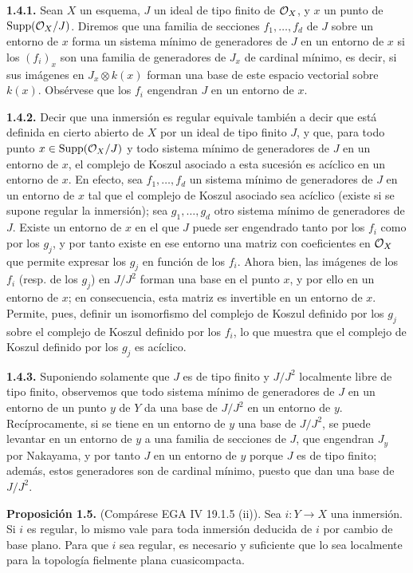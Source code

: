 \textbf{1.4.1.} Sean $X$ un esquema, $J$ un ideal de tipo finito de $\mathcal O_X$, y $x$ un punto de $\operatorname{Supp}(\mathcal O_X/J)$. Diremos que una familia de secciones $f_1,\ldots,f_d$ de $J$ sobre un entorno de $x$ forma un sistema mínimo de generadores de $J$ en un entorno de $x$ si los $(f_i)_x$ son una familia de generadores de $J_x$ de cardinal mínimo, es decir, si sus imágenes en $J_x\otimes k(x)$ forman una base de este espacio vectorial sobre $k(x)$. Obsérvese que los $f_i$ engendran $J$ en un entorno de $x$.

\textbf{1.4.2.} Decir que una inmersión es regular equivale también a decir que está definida en cierto abierto de $X$ por un ideal de tipo finito $J$, y que, para todo punto $x\in\operatorname{Supp}(\mathcal O_X/J)$ y todo sistema mínimo de generadores de $J$ en un entorno de $x$, el complejo de Koszul asociado a esta sucesión es acíclico en un entorno de $x$. En efecto, sea $f_1,\ldots,f_d$ un sistema mínimo de generadores de $J$ en un entorno de $x$ tal que el complejo de Koszul asociado sea acíclico (existe si se supone regular la inmersión); sea $g_1,\ldots,g_d$ otro sistema mínimo de generadores de $J$. Existe un entorno de $x$ en el que $J$ puede ser engendrado tanto por los $f_i$ como por los $g_j$, y por tanto existe en ese entorno una matriz con coeficientes en $\mathcal O_X$ que permite expresar los $g_j$ en función de los $f_i$. Ahora bien, las imágenes de los $f_i$ (resp. de los $g_j$) en $J/J^2$ forman una base en el punto $x$, y por ello en un entorno de $x$; en consecuencia, esta matriz es invertible en un entorno de $x$. Permite, pues, definir un isomorfismo del complejo de Koszul definido por los $g_j$ sobre el complejo de Koszul definido por los $f_i$, lo que muestra que el complejo de Koszul definido por los $g_j$ es acíclico.

\textbf{1.4.3.} Suponiendo solamente que $J$ es de tipo finito y $J/J^2$ localmente libre de tipo finito, observemos que todo sistema mínimo de generadores de $J$ en un entorno de un punto $y$ de $Y$ da una base de $J/J^2$ en un entorno de $y$. Recíprocamente, si se tiene en un entorno de $y$ una base de $J/J^2$, se puede levantar en un entorno de $y$ a una familia de secciones de $J$, que engendran $J_y$ por Nakayama, y por tanto $J$ en un entorno de $y$ porque $J$ es de tipo finito; además, estos generadores son de cardinal mínimo, puesto que dan una base de $J/J^2$.

\textbf{Proposición 1.5.} (Compárese EGA IV 19.1.5 (ii)). Sea $i:Y\longrightarrow X$ una inmersión. Si $i$ es regular, lo mismo vale para toda inmersión deducida de $i$ por cambio de base plano. Para que $i$ sea regular, es necesario y suficiente que lo sea localmente para la topología fielmente plana cuasicompacta.


